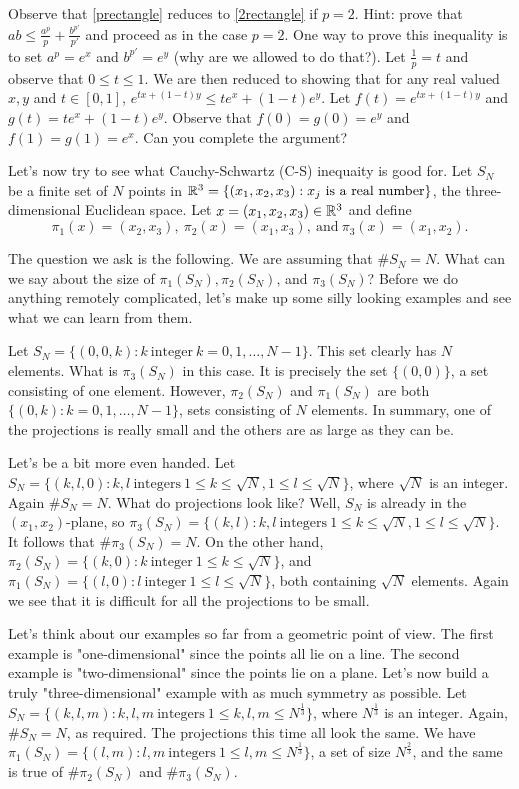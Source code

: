 \documentclass[]{amsart}
\numberwithin{equation}{section}
\theoremstyle{plain}
\theoremstyle{definition}
\theoremstyle{remark}
\begin{document}
Observe that \ref{prectangle} reduces to \ref{2rectangle} if $p=2$. Hint: prove that
$ab \leq \frac{a^p}{p}+\frac{b^{p'}}{p'}$ and proceed as in the
case $p=2$. One way to prove this inequality is to set $a^p=e^x$
and $b^{p'}=e^y$ (why are we allowed to do that?). Let
$\frac{1}{p}=t$ and observe that $0 \leq t \leq 1$. We are then
reduced to showing that for any real valued $x,y$ and $t \in
[0,1]$, $e^{tx+(1-t)y} \leq te^x+(1-t)e^y$. Let
$f(t)=e^{tx+(1-t)y}$ and $g(t)=te^x+(1-t)e^y$. Observe that
$f(0)=g(0)=e^y$ and $f(1)=g(1)=e^x$. Can you complete the
argument?



Let's now try to see what
Cauchy-Schwartz (C-S) inequaity is good for. Let $S_N$ be a finite set of
$N$ points in ${\Bbb R}^3=\{(x_1,x_2,x_3): x_j \ \text{is a real
number}\}$, the three-dimensional Euclidean space. Let $x=(x_1,x_2,x_3)
\in {\Bbb R}^3$ and define
$$ \pi_1(x)=(x_2,x_3), \ \pi_2(x)=(x_1,x_3), \ \text{and} \
\pi_3(x)=(x_1,x_2).$$

The question we ask is the following. We are assuming that $\# S_N=N$.
What can we say about the size of $\pi_1(S_N), \pi_2(S_N)$, and
$\pi_3(S_N)$? Before we do anything remotely complicated, let's make up
some silly looking examples and see what we can learn from them.

Let $S_N=\{(0,0,k): k \ \text{integer} \ k=0,1, \dots, N-1\}$. This set
clearly has $N$ elements. What is $\pi_3(S_N)$ in this case. It is
precisely the set $\{(0,0)\}$, a set consisting of one element. However,
$\pi_2(S_N)$ and $\pi_1(S_N)$ are both $\{(0,k): k=0,1,\dots,N-1\}$,
sets consisting of $N$ elements. In summary, one of the projections is
really small and the others are as large as they can be.

Let's be a bit more even handed. Let $S_N=\{(k,l,0): k,l \
\text{integers} \ 1 \leq k \leq \sqrt{N}, 1 \leq l \leq \sqrt{N}\}$, where
$\sqrt{N}$ is an integer. Again $\# S_N=N$. What do projections look
like? Well, $S_N$ is already in the $(x_1,x_2)$-plane, so
$\pi_3(S_N)=\{(k,l): k,l \
\text{integers} \ 1 \leq k \leq \sqrt{N}, 1 \leq l \leq \sqrt{N}\}$. It
follows that $\# \pi_3(S_N)=N$. On the other hand, $\pi_2(S_N)=\{(k,0):
k \ \text{integer} \ 1 \leq k \leq \sqrt{N} \}$, and
$\pi_1(S_N)=\{(l,0): l \ \text{integer} \ 1 \leq l \leq \sqrt{N} \}$,
both containing $\sqrt{N}$ elements. Again we see that it is difficult for
all the projections to be small.

Let's think about our examples so far from a geometric point of view. The
first example is "one-dimensional" since the points all lie on a line.
The second example is "two-dimensional" since the points lie on a plane.
Let's now build a truly "three-dimensional" example with as much symmetry
as possible. Let $S_N=\{(k,l,m): k,l,m \ \text{integers} \ 1 \leq k,l,m
\leq N^{\frac{1}{3}}\}$, where $N^{\frac{1}{3}}$ is an integer. Again,
$\# S_N=N$, as required. The projections this time all look the same. We
have $\pi_1(S_N)=\{(l,m): l,m \ \text{integers} \ 1 \leq l,m \leq
N^{\frac{1}{3}}\}$, a set of size $N^{\frac{2}{3}}$, and the same is true
of $\# \pi_2(S_N)$ and $\# \pi_3(S_N)$.
\end{document}

